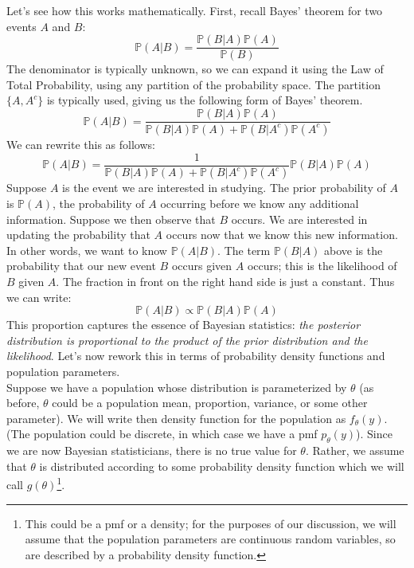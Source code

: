 \documentclass[12pt]{article}
\theoremstyle{definition}
\theoremstyle{remark}
\def\P{{\mathbb P}}
\begin{document}
Let's see how this works mathematically. First, recall Bayes' theorem for two events $A$ and $B$:
\[
\P(A | B) = \frac{\P(B|A) \P(A) }{\P(B) }
\]
The denominator is typically unknown, so we can expand it using the Law of Total Probability, using any partition of the probability space. The partition $\{A, A^c\}$ is typically used, giving us the following form of Bayes' theorem.
\[
\P(A | B) = \frac{\P(B|A) \P(A) }{\P(B|A) \P(A) + \P(B|A^c) \P(A^c)}
\]
We can rewrite this as follows:
\[
\P(A | B) = \frac{1}{\P(B|A) \P(A) + \P(B|A^c) \P(A^c)} \P(B|A) \P(A)
\]
Suppose $A$ is the event we are interested in studying. The prior probability of $A$ is $\P(A)$, the probability of $A$ occurring before we know any additional information. Suppose we then observe that $B$ occurs. We are interested in updating the probability that $A$ occurs now that we know this new information. In other words, we want to know $\P(A|B)$. The term $\P(B|A)$ above is the probability that our new event $B$ occurs given $A$ occurs; this is the likelihood of $B$ given $A$. The fraction in front on the right hand side is just a constant. Thus we can write:
\[
\P(A | B) \propto \P(B|A) \P(A)
\]
This proportion captures the essence of Bayesian statistics: \emph{the posterior distribution is proportional to the product of the prior distribution and the likelihood}. Let's now rework this in terms of probability density functions and population parameters.\\

Suppose we have a population whose distribution is parameterized by $\theta$ (as before, $\theta$ could be a population mean, proportion, variance, or some other parameter). We will write then density function for the population as $f_\theta(y)$. (The population could be discrete, in which case we have a pmf $p_\theta(y)$). Since we are now Bayesian statisticians, there is no true value for $\theta$. Rather, we assume that $\theta$ is distributed according to some probability density function which we will call $g(\theta)$\footnote{This could be a pmf or a density; for the purposes of our discussion, we will assume that the population parameters are continuous random variables, so are described by a probability density function.}. \\
\end{document}
